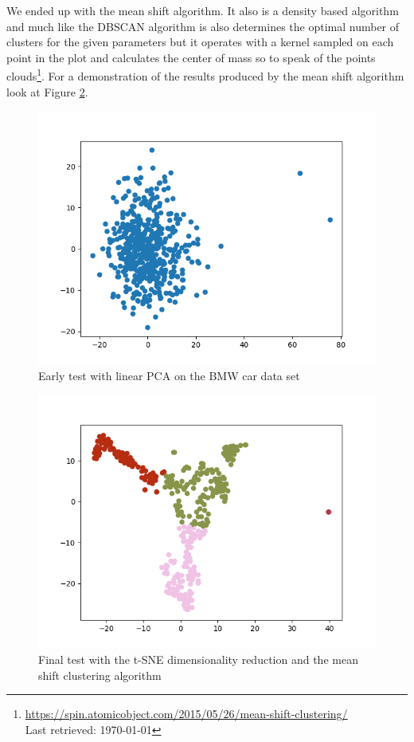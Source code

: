 \documentclass[journal]{vgtc}       %
\begin{document}
We ended up with the mean shift algorithm. It also is a density based algorithm and much like the DBSCAN algorithm is also determines the optimal number of clusters for the given parameters but it operates with a kernel sampled on each point in the plot and calculates the center of mass so to speak of the points clouds\footnote{\url{https://spin.atomicobject.com/2015/05/26/mean-shift-clustering/}\\ Last retrieved: \today}. For a demonstration of the results produced by the mean shift algorithm look at Figure \ref{fig:tsne}. 







\begin{figure}[tb]
	\begin{center}
		\includegraphics[width=.75\linewidth]{Figure2.png}
	\end{center}
	\caption{\label{fig:bmw} Early test with linear PCA on the BMW car data set \cite{stanfordcar} }
\end{figure}
\begin{figure}[tb]
	\begin{center}
		\includegraphics[width=.75\linewidth]{MS-tsne.png}
	\end{center}
	\caption{\label{fig:tsne} Final test with the t-SNE dimensionality reduction and the mean shift clustering algorithm }
\end{figure}
\end{document}
